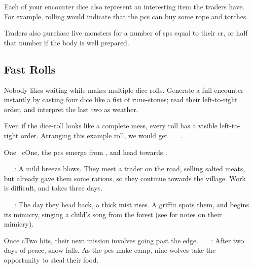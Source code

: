 \begin{multicols}{2}
Each of your encounter dice also represent an interesting item the traders have.
For example, rolling  would indicate that the \glspl{pc} can buy some rope and torches.

Traders also purchase live \glspl{monster} for a number of \glspl{sp} equal to their \gls{cr}, or half that number if the body is well prepared.

\subsection{Fast Rolls}

Nobody likes waiting while  makes multiple dice rolls.
Generate a full encounter instantly by casting four dice like a fist of rune-stones; read their left-to-right order, and interpret the last two as weather.

\begin{minipage}{.2\linewidth}

  \qquad{}

  \hspace{3pt}
\end{minipage}
\begin{minipage}{.7\linewidth}
  \vspace{.5em}
  Even if the dice-roll looks like a complete mess, every roll has a visible left-to-right order.
  Arranging this example roll, we would get ~~~.
\end{minipage}

\toggletrue{genExamples}
\allEncounterTables

\begin{exampletext}

  One \showTemperature~\gls{cOne}, the \glspl{pc} emerge from , and head towards .

  ~~~: A mild breeze blows.
  They meet a trader on the road, selling salted meats, but  already gave them some rations, so they continue towards the \gls{village}.
  Work is difficult, and takes three days.

  ~~~: The day they head back, a thick mist rises.
  A griffin spots them, and begins its mimicry, singing a child's song from the forest (see  for notes on their mimicry).

  Once \gls{cTwo} hits, their next mission involves going past the \gls{edge}.
  ~~~: After two days of peace, snow falls.
  As the \glspl{pc} make camp, nine wolves take the opportunity to steal their food.

\end{exampletext}

\end{multicols}

